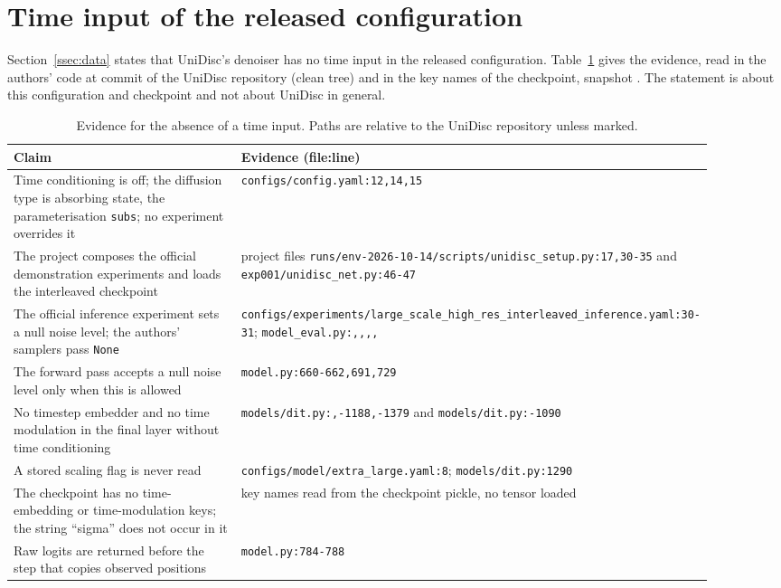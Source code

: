 \section{Time input of the released configuration}\label{app:timefree}
Section~\ref{ssec:data} states that UniDisc's denoiser has no time input in the released configuration.
Table~\ref{tab:timefree} gives the evidence, read in the authors' code at commit
\texttt{} of the UniDisc repository (clean tree) and in the key names of the
checkpoint, snapshot \texttt{}.
The statement is about this configuration and checkpoint and not about UniDisc in general.
\begin{table}[t]
\centering
\caption{Evidence for the absence of a time input. Paths are relative to the UniDisc repository unless marked.}
\label{tab:timefree}
\footnotesize
\begin{tabular}{p{0.4\linewidth}p{0.5\linewidth}}
\toprule
Claim & Evidence (file:line) \\
\midrule
Time conditioning is off; the diffusion type is absorbing state, the parameterisation \texttt{subs}; no experiment overrides it & \texttt{configs/config.yaml:12,14,15} \\
The project composes the official demonstration experiments and loads the interleaved checkpoint & project files \texttt{runs/env-2026-10-14/\allowbreak scripts/\allowbreak unidisc\_\allowbreak setup.py:17,30-35} and \texttt{exp001/\allowbreak unidisc\_\allowbreak net.py:46-47} \\
The official inference experiment sets a null noise level; the authors' samplers pass \texttt{None} & \texttt{configs/\allowbreak experiments/\allowbreak large\_\allowbreak scale\_\allowbreak high\_\allowbreak res\_\allowbreak interleaved\_\allowbreak inference.\allowbreak yaml:30-31}; \texttt{model\_eval.py:\allowbreak 2057,\allowbreak 2086,\allowbreak 3019,\allowbreak 3060,\allowbreak 3186} \\
The forward pass accepts a null noise level only when this is allowed & \texttt{model.py:660-662,691,729} \\
No timestep embedder and no time modulation in the final layer without time conditioning & \texttt{models/\allowbreak dit.py:\allowbreak 1105,\allowbreak 1186-1188,\allowbreak 1377-1379} and \texttt{models/\allowbreak dit.py:\allowbreak 1064-1090} \\
A stored scaling flag is never read & \texttt{configs/\allowbreak model/\allowbreak extra\_\allowbreak large.yaml:8}; \texttt{models/\allowbreak dit.py:1290} \\
The checkpoint has no time-embedding or time-modulation keys; the string ``sigma'' does not occur in it & key names read from the checkpoint pickle, no tensor loaded \\
Raw logits are returned before the step that copies observed positions & \texttt{model.py:784-788} \\
\bottomrule
\end{tabular}
\end{table}


